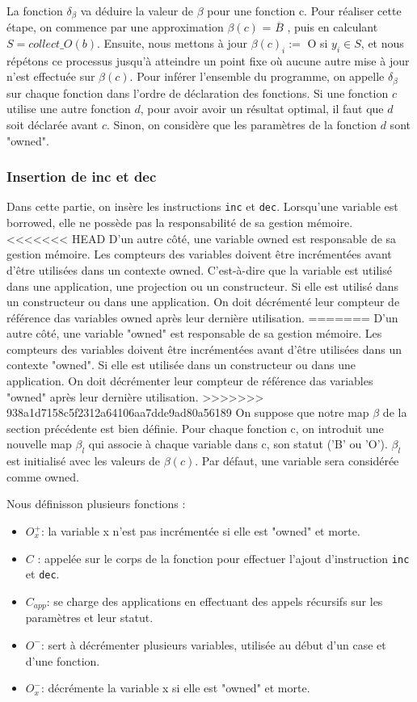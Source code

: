\documentclass{rapportECL}
\begin{document}
La fonction $\delta_{\beta}$ va déduire la valeur de $\beta$ pour une fonction c. 
Pour réaliser cette étape, on commence par une approximation $\beta(c)$ = $\overline{B}$ , puis en calculant $S = collect\_O(b)$. 
Ensuite, nous mettons à jour  $\beta(c)_i :=$ O  si $y_i \in S $, et nous répétons ce processus jusqu'à atteindre un point fixe où aucune autre mise à jour 
n'est effectuée sur $\beta(c)$.
Pour inférer l'ensemble du programme, on appelle $\delta_{\beta}$ sur chaque fonction dans l'ordre de déclaration des fonctions. 
Si une fonction $c$ utilise une autre fonction $d$, pour avoir avoir un résultat optimal, il faut que $d$ soit déclarée avant $c$. 
Sinon, on considère que les paramètres de la fonction $d$ sont "owned".


\subsubsection{Insertion de inc et dec}
Dans cette partie, on insère les instructions \verb|inc| et \verb|dec|.
Lorsqu'une variable est borrowed, elle ne possède pas la responsabilité de sa gestion mémoire. 
<<<<<<< HEAD
D'un autre côté, une variable owned est responsable de sa gestion mémoire.
Les compteurs des variables doivent être incrémentées avant d'être utilisées dans un contexte owned. 
C'est-à-dire que la variable est utilisé dans une application, une projection ou un constructeur.
Si elle est utilisé dans un constructeur ou dans une application.
On doit décrémenté leur compteur de référence das variables owned après leur dernière utilisation. 
=======
D'un autre côté, une variable "owned" est responsable de sa gestion mémoire.
Les compteurs des variables doivent être incrémentées avant d'être utilisées dans un contexte "owned". 
Si elle est utilisée dans un constructeur ou dans une application.
On doit décrémenter leur compteur de référence das variables "owned" après leur dernière utilisation. 
>>>>>>> 938a1d7158c5f2312a64106aa7dde9ad80a56189
On suppose que notre map $\beta$ de la section précédente est bien définie. 
Pour chaque fonction c, on introduit une nouvelle map $\beta_l$ qui associe à chaque variable dans c, son statut ('B' ou 'O'). 
$\beta_l$ est initialisé avec les valeurs de $\beta(c)$. Par défaut, une variable sera considérée comme owned.

Nous définisson plusieurs fonctions :
\begin{itemize}
    \item $O_x^{+}$: la variable x n'est pas incrémentée si elle est "owned" et morte.
    \item $C$ : appelée sur le corps de la fonction pour effectuer l'ajout d'instruction \verb|inc| et \verb|dec|.
    \item $C_{app}$: se charge des applications en effectuant des appels récursifs sur les paramètres et leur statut.
    \item $O^{-}$: sert à décrémenter plusieurs variables, utilisée au début d'un case et d'une fonction.
    \item  $O_x^{-}$: décrémente la variable x si elle est "owned" et morte.   
\end{itemize}
\end{document}
